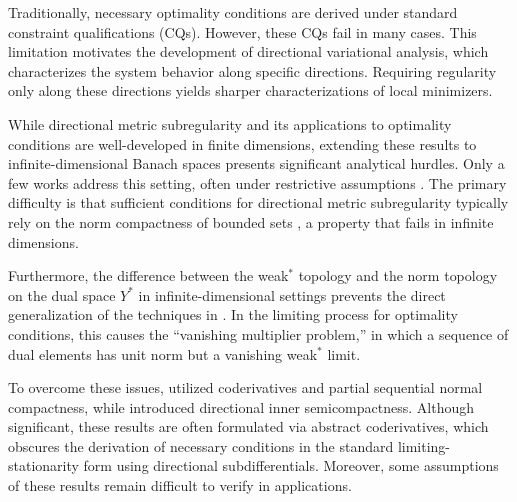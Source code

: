\documentclass[12pt,twoside,reqno]{amsart}
\theoremstyle{definition}
\numberwithin{equation}{section}
\begin{document}
Traditionally, necessary optimality conditions are derived under standard constraint qualifications (CQs). However, these CQs fail in many cases. This limitation motivates the development of directional variational analysis, which characterizes the system behavior along specific directions. Requiring regularity only along these directions yields sharper characterizations of local minimizers.

While directional metric subregularity and its applications to optimality conditions are well-developed in finite dimensions, extending these results to infinite-dimensional Banach spaces presents significant analytical hurdles. Only a few works address this setting, often under restrictive assumptions \cite{gfrerer2013directional,gfrerer2014metric,long2017calculus,long2017calculusb}. The primary difficulty is that sufficient conditions for directional metric subregularity typically rely on the norm compactness of bounded sets \cite{bai2019directional}, a property that fails in infinite dimensions.

Furthermore, the difference between the weak\(^*\) topology and the norm topology on the dual space $Y^*$ in infinite-dimensional settings prevents the direct generalization of the techniques in \cite{gfrerer2014metric,bai2019directional}. In the limiting process for optimality conditions, this causes the ``vanishing multiplier problem,'' in which a sequence of dual elements has unit norm but a vanishing weak\(^*\) limit. 

To overcome these issues, \cite{gfrerer2013directional} utilized coderivatives and partial sequential normal compactness, while \cite{long2017calculus,long2017calculusb} introduced directional inner semicompactness. Although significant, these results are often formulated via abstract coderivatives, which obscures the derivation of necessary conditions in the standard limiting-stationarity form using directional subdifferentials. Moreover, some assumptions of these results remain difficult to verify in applications.
\end{document}
